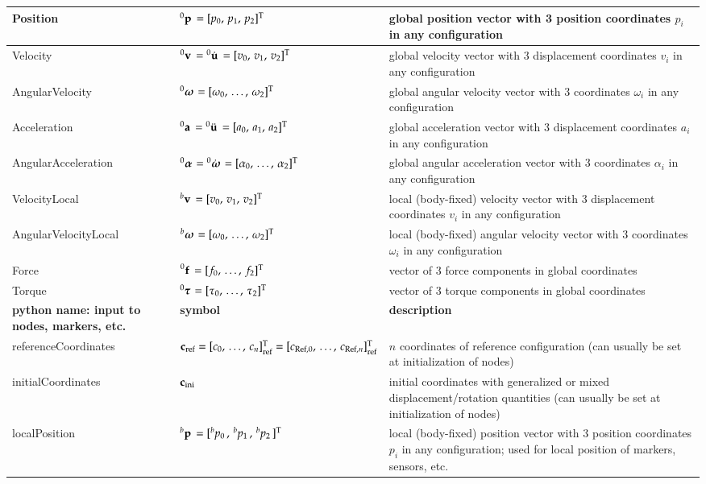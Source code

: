 \documentclass[11pt,a4paper]{book} %
\newcommand{\cIni}{_\mathrm{ini}} %
\newcommand{\cRef}{_\mathrm{ref}} %
\begin{document}
\begin{center}
\begin{longtable}{| p{5cm} | p{5cm} | p{6cm} |}
    Position & $\prescript{0}{}{\mathbf{p}}\, = [p_0,\, p_1,\, p_2]^\mathrm{T}$ & global position vector with 3 position coordinates $p_i$ in any configuration\\ \hline
    Velocity & $\prescript{0}{}{\mathbf{v}}\, = \prescript{0}{}{\dot {\mathbf{u}}}\, = [v_0,\, v_1,\, v_2]^\mathrm{T}$ & global velocity vector with 3 displacement coordinates $v_i$ in any configuration\\ \hline
    AngularVelocity & $\prescript{0}{}{\mbox{\boldmath $\omega$ \unboldmath}\!\!}\, = [\omega_0,\, \ldots,\, \omega_2]^\mathrm{T}$ & global angular velocity vector with $3$ coordinates $\omega_i$ in any configuration\\ \hline
    Acceleration & $\prescript{0}{}{\mathbf{a}}\, = \prescript{0}{}{\ddot {\mathbf{u}}}\, = [a_0,\, a_1,\, a_2]^\mathrm{T}$ & global acceleration vector with 3 displacement coordinates $a_i$ in any configuration\\ \hline
    AngularAcceleration & $\prescript{0}{}{\mbox{\boldmath $\alpha$ \unboldmath}\!\!}\, = \prescript{0}{}{\dot {\mbox{\boldmath $\omega$ \unboldmath}\!\!}}\, = [\alpha_0,\, \ldots,\, \alpha_2]^\mathrm{T}$ & global angular acceleration vector with $3$ coordinates $\alpha_i$ in any configuration\\ \hline
%
    VelocityLocal & $\prescript{b}{}{\mathbf{v}}\, = [v_0,\, v_1,\, v_2]^\mathrm{T}$ & local (body-fixed) velocity vector with 3 displacement coordinates $v_i$ in any configuration\\ \hline
    AngularVelocityLocal & $\prescript{b}{}{\mbox{\boldmath $\omega$ \unboldmath}\!\!}\, = [\omega_0,\, \ldots,\, \omega_2]^\mathrm{T}$ & local (body-fixed) angular velocity vector with $3$ coordinates $\omega_i$ in any configuration\\ \hline
    Force & $\prescript{0}{}{\mathbf{f}}\, = [f_0,\, \ldots,\, f_2]^\mathrm{T}$ & vector of $3$ force components in global coordinates\\ \hline
    Torque & $\prescript{0}{}{\mbox{\boldmath $\tau$ \unboldmath}\!\!}\, = [\tau_0,\, \ldots,\, \tau_2]^\mathrm{T}$ & vector of $3$ torque components in global coordinates\\ \hline
		\hline %
    \bf python name: input to nodes, markers, etc. & \bf symbol & \bf description \\ \hline
    referenceCoordinates & $\cv\cRef = [c_0,\, \ldots,\, c_n]\cRef\tp = [c_{\mathrm{Ref},0},\, \ldots,\, c_{\mathrm{Ref},n}]\cRef\tp$ & $n$ coordinates of reference configuration (can usually be set at initialization of nodes)\\ \hline
    initialCoordinates & $\cv\cIni$ & initial coordinates with generalized or mixed displacement/rotation quantities (can usually be set at initialization of nodes)  \\ \hline
    localPosition & $\prescript{b}{}{\mathbf{p}}\, = [\prescript{b}{}{p}_{0}\,,\, \prescript{b}{}{p}_{1}\,,\, \prescript{b}{}{p}_{2}\,]^\mathrm{T}$ & local (body-fixed) position vector with 3 position coordinates $p_i$ in any configuration; used for local position of markers, sensors, etc.\\ \hline
	  \end{longtable}
	\end{center}
\end{document}
